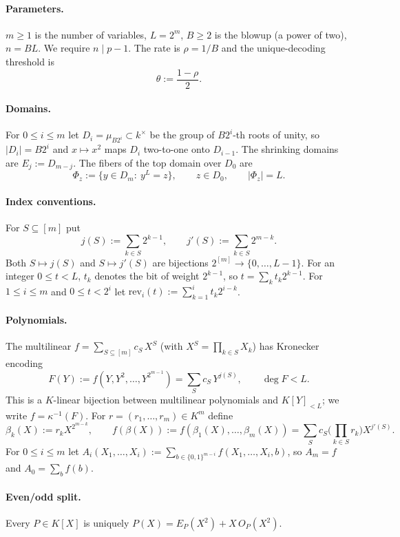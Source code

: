 \documentclass[11pt]{article}
\theoremstyle{definition}
\newcommand{\K}{K}
\newcommand{\rev}{\mathrm{rev}}
\begin{document}
\paragraph{Parameters.} $m\ge1$ is the number of variables, $L=2^m$, $B\ge2$ is the blowup (a power of two), $n=BL$. We require $n\mid p-1$. The rate is $\rho=1/B$ and the unique-decoding threshold is
\[
\theta:=\frac{1-\rho}{2}.
\]

\paragraph{Domains.} For $0\le i\le m$ let $D_i=\mu_{B2^i}\subset k^\times$ be the group of $B2^i$-th roots of unity, so $|D_i|=B2^i$ and $x\mapsto x^2$ maps $D_i$ two-to-one onto $D_{i-1}$. The shrinking domains are $E_j:=D_{m-j}$. The fibers of the top domain over $D_0$ are
\[
\Phi_z:=\{y\in D_m:\ y^L=z\},\qquad z\in D_0,\qquad |\Phi_z|=L .
\]

\paragraph{Index conventions.} For $S\subseteq[m]$ put
\[
j(S):=\sum_{k\in S}2^{k-1},\qquad j'(S):=\sum_{k\in S}2^{m-k}.
\]
Both $S\mapsto j(S)$ and $S\mapsto j'(S)$ are bijections $2^{[m]}\to\{0,\dots,L-1\}$. For an integer $0\le t<L$, $t_k$ denotes the bit of weight $2^{k-1}$, so $t=\sum_k t_k2^{k-1}$. For $1\le i\le m$ and $0\le t<2^i$ let $\rev_i(t):=\sum_{k=1}^{i}t_k2^{i-k}$.

\paragraph{Polynomials.} The multilinear $f=\sum_{S\subseteq[m]}c_S\,X^S$ (with $X^S=\prod_{k\in S}X_k$) has Kronecker encoding
\[
F(Y):=f(Y,Y^2,\dots,Y^{2^{m-1}})=\sum_{S}c_S\,Y^{j(S)},\qquad \deg F<L.
\]
This is a $\K$-linear bijection between multilinear polynomials and $\K[Y]_{<L}$; we write $f=\kappa^{-1}(F)$. For $r=(r_1,\dots,r_m)\in\K^m$ define
\[
\beta_k(X):=r_kX^{2^{m-k}},\qquad f(\beta(X)):=f(\beta_1(X),\dots,\beta_m(X))=\sum_S c_S\Big(\prod_{k\in S}r_k\Big)X^{j'(S)}.
\]
For $0\le i\le m$ let $A_i(X_1,\dots,X_i):=\sum_{b\in\{0,1\}^{m-i}}f(X_1,\dots,X_i,b)$, so $A_m=f$ and $A_0=\sum_bf(b)$.

\paragraph{Even/odd split.} Every $P\in\K[X]$ is uniquely $P(X)=E_P(X^2)+X\,O_P(X^2)$.
\end{document}
